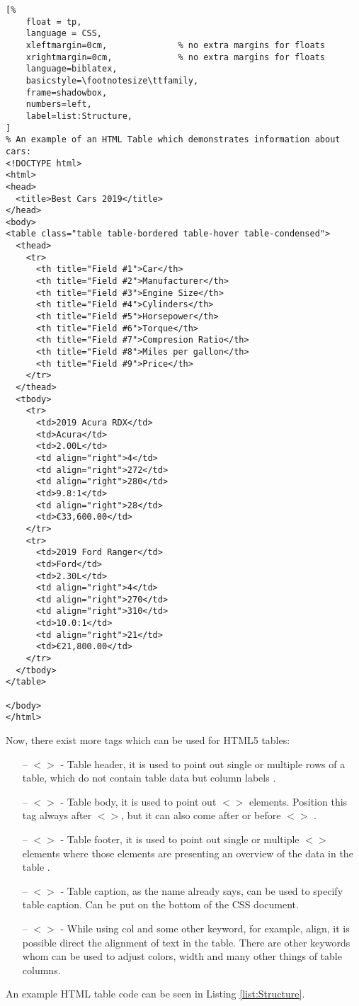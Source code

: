 \begin{lstlisting}[%
    float = tp,
    language = CSS,
    xleftmargin=0cm,              % no extra margins for floats
    xrightmargin=0cm,             % no extra margins for floats
    language=biblatex,
    basicstyle=\footnotesize\ttfamily,
    frame=shadowbox,
    numbers=left,
    label=list:Structure,
]
% An example of an HTML Table which demonstrates information about cars:
<!DOCTYPE html>
<html>
<head>
  <title>Best Cars 2019</title>
</head>
<body>
<table class="table table-bordered table-hover table-condensed">
  <thead>
    <tr>
      <th title="Field #1">Car</th>
      <th title="Field #2">Manufacturer</th>
      <th title="Field #3">Engine Size</th>
      <th title="Field #4">Cylinders</th>
      <th title="Field #5">Horsepower</th>
      <th title="Field #6">Torque</th>
      <th title="Field #7">Compresion Ratio</th>
      <th title="Field #8">Miles per gallon</th>
      <th title="Field #9">Price</th>
    </tr>
  </thead>
  <tbody>
    <tr>
      <td>2019 Acura RDX</td>
      <td>Acura</td>
      <td>2.00L</td>
      <td align="right">4</td>
      <td align="right">272</td>
      <td align="right">280</td>
      <td>9.8:1</td>
      <td align="right">28</td>
      <td>€33,600.00</td>
    </tr>
    <tr>
      <td>2019 Ford Ranger</td>
      <td>Ford</td>
      <td>2.30L</td>
      <td align="right">4</td>
      <td align="right">270</td>
      <td align="right">310</td>
      <td>10.0:1</td>
      <td align="right">21</td>
      <td>€21,800.00</td>
    </tr>
  </tbody>
</table>

</body>
</html>

\end{lstlisting}

Now, there exist more tags which can be used for HTML5 tables:
\begin{itemize}
    \item[--] $<$$>$ - Table header, it is used to point
out single or multiple rows of a table, which do not contain table
data but column labels \parencite{ChrisCoyier}.

    \item[--] $<$$>$ - Table body, it is used to point
out $<$$>$ elements. Position this tag always after
$<$$>$, but it can also come after or before
$<$$>$ \parencite{ChrisCoyier}.

    \item[--] $<$$>$ - Table footer, it is used to point
out single or multiple $<$$>$ elements where those elements
are presenting an overview  of the data in the table
\parencite{ChrisCoyier}.

    \item[--] $<$$>$ - Table caption, as the name
already says, can be used to specify table caption. Can be put on the
bottom of the CSS document.

    \item[--] $<$$>$ - While using col and some other
keyword, for example, align, it is possible direct the alignment of
text in the table. There are other keywords whom can be used to adjust
colors, width and many other things of table columns.
\end{itemize}

An example HTML table code can be seen in Listing \ref{list:Structure}.
